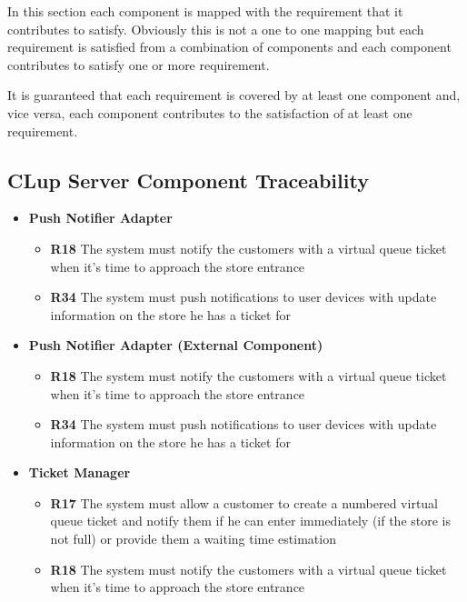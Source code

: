 In this section each component is mapped with the requirement that it contributes to satisfy. Obviously this is not a one to one mapping but each requirement is satisfied from a combination of components and each component contributes to satisfy one or more requirement.

It is guaranteed that each requirement is covered by at least one component and, vice versa, each component contributes to the satisfaction of at least one requirement.

\subsection{CLup Server Component Traceability}
\begin{itemize}
    \item \colorbox{clup_red}{\textbf{Push Notifier Adapter}}
          \begin{itemize}
              \item \textbf{R18} The system must notify the customers with a virtual queue ticket when it’s time to approach the store entrance
              \item \textbf{R34} The system must push notifications to user devices with update information on the store he has a ticket for
          \end{itemize}
    \item \colorbox{clup_red}{\textbf{Push Notifier Adapter (External Component)}}
          \begin{itemize}
              \item \textbf{R18} The system must notify the customers with a virtual queue ticket when it’s time to approach the store entrance
              \item \textbf{R34} The system must push notifications to user devices with update information on the store he has a ticket for
          \end{itemize}
    \item \colorbox{clup_red}{\textbf{Ticket Manager}}
          \begin{itemize}
              \item \textbf{R17} The system must allow a customer to create a numbered virtual queue ticket and notify them if he can enter immediately (if the store is not full) or provide them a waiting time estimation
              \item \textbf{R18} The system must notify the customers with a virtual queue ticket when it’s time to approach the store entrance

\end{itemize}
\end{itemize}
